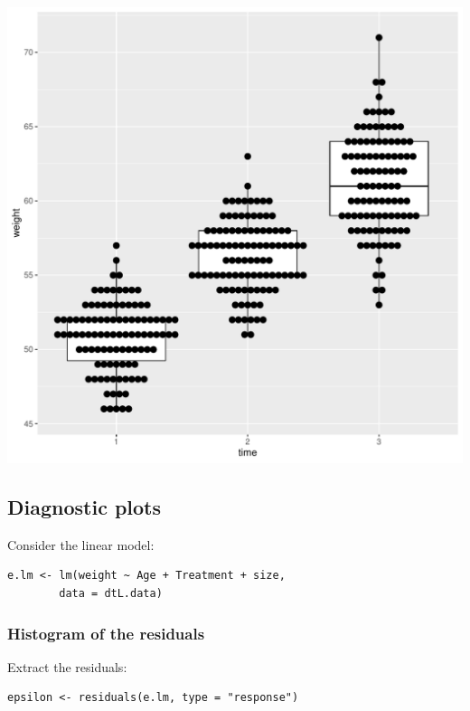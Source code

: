 \documentclass{article}
\begin{document}
\begin{center}
\includegraphics[width=.9\linewidth]{./figures/fig-hist.pdf}
\end{center}

\subsection{Diagnostic plots}
\label{sec:org4bb263e}

Consider the linear model:
\lstset{language=r,label= ,caption= ,captionpos=b,numbers=none}
\begin{lstlisting}
e.lm <- lm(weight ~ Age + Treatment + size,
	    data = dtL.data)
\end{lstlisting}

\subsubsection{Histogram of the residuals}
\label{sec:orgfd2a04b}

Extract the residuals:
\lstset{language=r,label= ,caption= ,captionpos=b,numbers=none}
\begin{lstlisting}
epsilon <- residuals(e.lm, type = "response")
\end{lstlisting}
\end{document}
